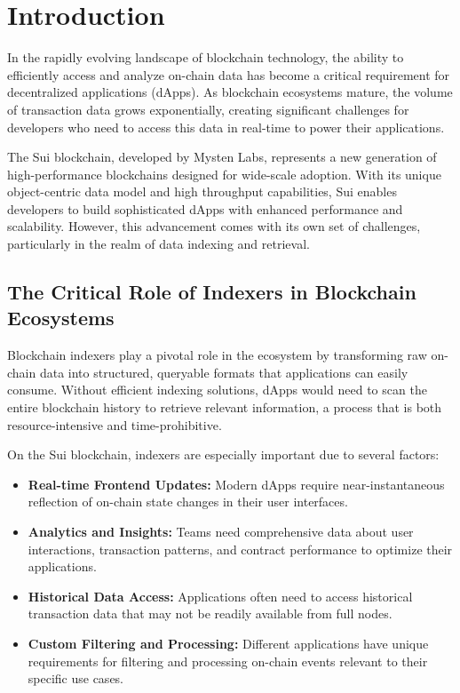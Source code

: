 \section{Introduction}

In the rapidly evolving landscape of blockchain technology, the ability to efficiently access and analyze on-chain data has become a critical requirement for decentralized applications (dApps). As blockchain ecosystems mature, the volume of transaction data grows exponentially, creating significant challenges for developers who need to access this data in real-time to power their applications.

The Sui blockchain, developed by Mysten Labs, represents a new generation of high-performance blockchains designed for wide-scale adoption. With its unique object-centric data model and high throughput capabilities, Sui enables developers to build sophisticated dApps with enhanced performance and scalability. However, this advancement comes with its own set of challenges, particularly in the realm of data indexing and retrieval.

\subsection{The Critical Role of Indexers in Blockchain Ecosystems}

Blockchain indexers play a pivotal role in the ecosystem by transforming raw on-chain data into structured, queryable formats that applications can easily consume. Without efficient indexing solutions, dApps would need to scan the entire blockchain history to retrieve relevant information, a process that is both resource-intensive and time-prohibitive.

On the Sui blockchain, indexers are especially important due to several factors:

\begin{itemize}
    \item \textbf{Real-time Frontend Updates:} Modern dApps require near-instantaneous reflection of on-chain state changes in their user interfaces.
    \item \textbf{Analytics and Insights:} Teams need comprehensive data about user interactions, transaction patterns, and contract performance to optimize their applications.
    \item \textbf{Historical Data Access:} Applications often need to access historical transaction data that may not be readily available from full nodes.
    \item \textbf{Custom Filtering and Processing:} Different applications have unique requirements for filtering and processing on-chain events relevant to their specific use cases.
\end{itemize}


